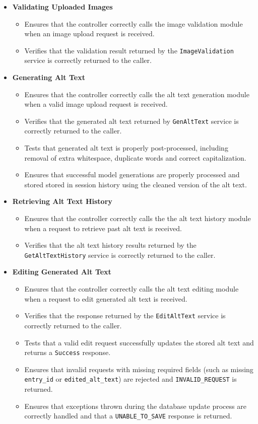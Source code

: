 \documentclass[12pt, titlepage]{article}
\begin{document}
\begin{itemize}
  \item \textbf{Validating Uploaded Images}
  \begin{itemize}
    \item Ensures that the controller correctly calls the image validation module when an image upload request is received.
    \item Verifies that the validation result returned by the \texttt{ImageValidation} service is correctly returned to the caller.
  \end{itemize}

  \item \textbf{Generating Alt Text}
  \begin{itemize}
    \item Ensures that the controller correctly calls the alt text generation module when a valid image upload request is received.
    \item Verifies that the generated alt text returned by \texttt{GenAltText} service is correctly returned to the caller.
    \item Tests that generated alt text is properly post-processed, including removal of extra whitespace, duplicate words and correct capitalization. 
    \item Ensures that successful model generations are properly processed and stored stored in session history using the cleaned version of the alt text. 
  \end{itemize}

  \item \textbf{Retrieving Alt Text History}
  \begin{itemize}
    \item Ensures that the controller correctly calls the the alt text history module when a request to retrieve past alt text is received.
    \item Verifies that the alt text history results returned by the \texttt{GetAltTextHistory} service is correctly returned to the caller.
  \end{itemize}

  \item \textbf{Editing Generated Alt Text}
  \begin{itemize}
    \item Ensures that the controller correctly calls the alt text editing module when a request to edit generated alt text is received.
    \item Verifies that the response returned by the \texttt{EditAltText} service is correctly returned to the caller.
    \item Tests that a valid edit request successfully updates the stored alt text and returns a \texttt{Success} response.
    \item Ensures that invalid requests with missing required fields (such as missing \texttt{entry\_id} or \texttt{edited\_alt\_text}) are rejected and \texttt{INVALID\_REQUEST} is returned.
    \item Ensures that exceptions thrown during the database update process are correctly handled and that a \texttt{UNABLE\_TO\_SAVE} response is returned. 
  \end{itemize}


\end{itemize}
\end{document}
